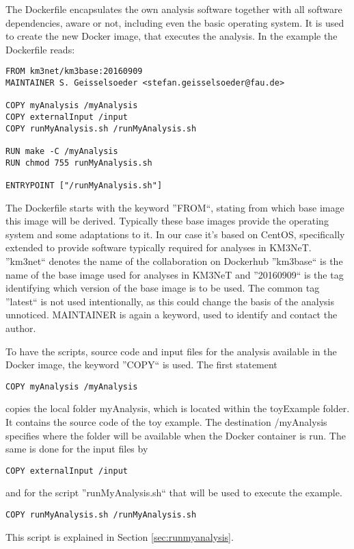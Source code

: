 \documentclass[a4paper, twoside, 11pt]{article}
\begin{document}
The Dockerfile encapsulates the own analysis software together 
with all software dependencies, aware or not, 
including even the basic operating system.
It is used to create the new Docker image, that executes the analysis. 
In the example the Dockerfile reads: 
\begin{lstlisting}[basicstyle=\footnotesize\ttfamily,frame=single]
FROM km3net/km3base:20160909
MAINTAINER S. Geisselsoeder <stefan.geisselsoeder@fau.de>

COPY myAnalysis /myAnalysis
COPY externalInput /input
COPY runMyAnalysis.sh /runMyAnalysis.sh

RUN make -C /myAnalysis
RUN chmod 755 runMyAnalysis.sh

ENTRYPOINT ["/runMyAnalysis.sh"]
\end{lstlisting}
The Dockerfile starts with the keyword ''FROM``, 
stating from which base image this image will be derived.
Typically these base images provide the operating system and some adaptations to it. 
In our case it's based on CentOS, 
specifically extended to provide software typically required for analyses in KM3NeT. 
''km3net`` denotes the name of the collaboration on Dockerhub\cite{dockerhub:km3net}
''km3base`` is the name of the base image used for analyses in KM3NeT and 
''20160909`` is the tag identifying which version of the base image is to be used. 
The common tag ''latest`` is not used intentionally, as this could change the basis of the analysis unnoticed. 
MAINTAINER is again a keyword, used to identify and contact the author. 

\label{sec:addingYourCode}
To have the scripts, source code and input files for the analysis available in the Docker image, the keyword ''COPY`` is used.
The first statement 
\begin{lstlisting}[basicstyle=\footnotesize\ttfamily,frame=single]
COPY myAnalysis /myAnalysis
\end{lstlisting}
copies the local folder myAnalysis, which is located within the toyExample folder. 
It contains the source code of the toy example.
The destination /myAnalysis specifies where the folder will be available when the Docker container is run. 
The same is done for the input files by
\begin{lstlisting}[basicstyle=\footnotesize\ttfamily,frame=single]
COPY externalInput /input 
\end{lstlisting}
and for the script ''runMyAnalysis.sh`` that will be used to execute the example. 
\begin{lstlisting}[basicstyle=\footnotesize\ttfamily,frame=single]
COPY runMyAnalysis.sh /runMyAnalysis.sh
\end{lstlisting}
This script is explained in Section \ref{sec:runmyanalysis}.
\end{document}

